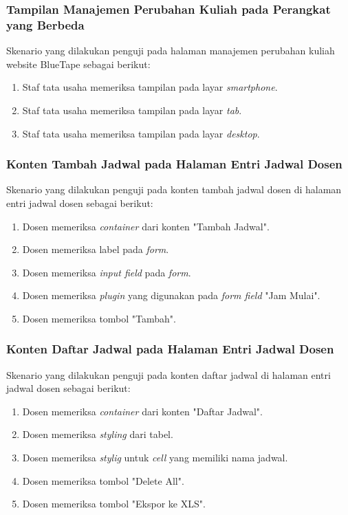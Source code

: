 \subsubsection{Tampilan Manajemen Perubahan Kuliah pada Perangkat yang Berbeda}
Skenario yang dilakukan penguji pada halaman manajemen perubahan kuliah website BlueTape sebagai berikut:
\begin{enumerate}
	\item Staf tata usaha memeriksa tampilan pada layar \textit{smartphone}. 	
	\item Staf tata usaha memeriksa tampilan pada layar \textit{tab}.
	\item Staf tata usaha memeriksa tampilan pada layar \textit{desktop}.
\end{enumerate}

\subsubsection{Konten Tambah Jadwal pada Halaman Entri Jadwal Dosen}
Skenario yang dilakukan penguji pada konten tambah jadwal dosen di halaman entri jadwal dosen sebagai berikut:
\begin{enumerate}
	\item Dosen memeriksa \textit{container} dari konten "Tambah Jadwal".	
	\item Dosen memeriksa label pada \textit{form}. 
	\item Dosen memeriksa \textit{input field} pada \textit{form}.
	\item Dosen memeriksa \textit{plugin} yang digunakan pada \textit{form field} "Jam Mulai".
	\item Dosen memeriksa tombol "Tambah".
\end{enumerate}

\subsubsection{Konten Daftar Jadwal pada Halaman Entri Jadwal Dosen}
Skenario yang dilakukan penguji pada konten daftar jadwal di halaman entri jadwal dosen sebagai berikut:
\begin{enumerate}
	\item Dosen memeriksa \textit{container} dari konten "Daftar Jadwal".
	\item Dosen memeriksa \textit{styling} dari tabel.	
	\item Dosen memeriksa \textit{stylig} untuk \textit{cell} yang memiliki nama jadwal.			
	\item Dosen memeriksa tombol "Delete All".
	\item Dosen memeriksa tombol "Ekspor ke XLS".
\end{enumerate}

